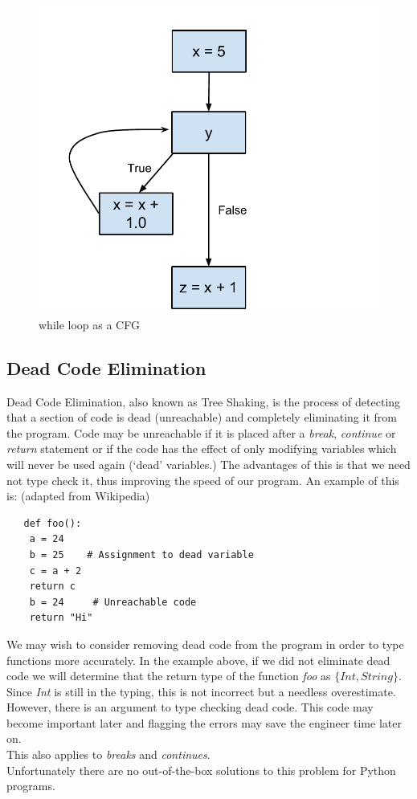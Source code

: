 \documentclass[12pt, titlepage]{article}
\begin{document}
\begin{figure}[h]
\centering
\includegraphics[scale=0.5]{images/ssaPhiNode.pdf}
\caption{while loop as a CFG}
\label{phiCFG}
\end{figure}

\subsection{Dead Code Elimination}
Dead Code Elimination, also known as Tree Shaking, is the process of detecting that a section of code is dead (unreachable) and completely eliminating it from the program. Code may be unreachable if it is placed after a \textit{break}, \textit{continue} or \textit{return} statement or if the code has the effect of only modifying variables which will never be used again (`dead' variables.) The advantages of this is that we need not type check it, thus improving the speed of our program.
An example of this is: (adapted from Wikipedia)
\begin{lstlisting}
   def foo():
   	a = 24
   	b = 25    # Assignment to dead variable
   	c = a + 2
   	return c
   	b = 24 	   # Unreachable code
   	return "Hi"
\end{lstlisting}
We may wish to consider removing dead code from the program in order to type functions more accurately. In the example above, if we did not eliminate dead code we will determine that the return type of the function \textit{foo} as $\{Int, String\}$. Since \textit{Int} is still in the typing, this is not incorrect but a needless overestimate. However, there is an argument to type checking dead code. This code may become important later and flagging the errors may save the engineer time later on. \\
This also applies to \textit{breaks} and \textit{continues}. \\
Unfortunately there are no out-of-the-box solutions to this problem for Python programs. \\
\end{document}
